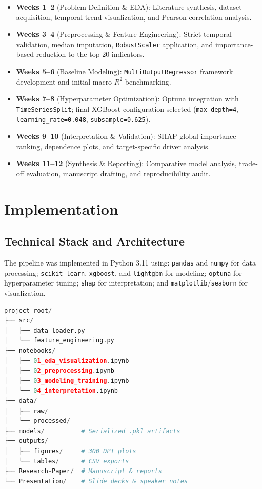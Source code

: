\documentclass[conference]{IEEEtran}
\begin{document}
\begin{itemize}
    \item \textbf{Weeks 1--2} (Problem Definition \& EDA): Literature
    synthesis, dataset acquisition, temporal trend visualization, and Pearson
    correlation analysis.
    \item \textbf{Weeks 3--4} (Preprocessing \& Feature Engineering): Strict
    temporal validation, median imputation, \texttt{RobustScaler} application,
    and importance-based reduction to the top 20 indicators.
    \item \textbf{Weeks 5--6} (Baseline Modeling): \texttt{MultiOutputRegressor}
    framework development and initial macro-$R^2$ benchmarking.
    \item \textbf{Weeks 7--8} (Hyperparameter Optimization): Optuna integration
    with \texttt{TimeSeriesSplit}; final XGBoost configuration selected
    (\texttt{max\_depth=4}, \texttt{learning\_rate=0.048},
    \texttt{subsample=0.625}).
    \item \textbf{Weeks 9--10} (Interpretation \& Validation): SHAP global
    importance ranking, dependence plots, and target-specific driver analysis.
    \item \textbf{Weeks 11--12} (Synthesis \& Reporting): Comparative model
    analysis, trade-off evaluation, manuscript drafting, and reproducibility
    audit.
\end{itemize}

\section{Implementation}

\subsection{Technical Stack and Architecture}

The pipeline was implemented in Python 3.11 using: \texttt{pandas} and
\texttt{numpy} for data processing; \texttt{scikit-learn}, \texttt{xgboost},
and \texttt{lightgbm} for modeling; \texttt{optuna} for hyperparameter tuning;
\texttt{shap} for interpretation; and \texttt{matplotlib}/\texttt{seaborn} for
visualization.

\begin{lstlisting}[language=Python, caption={Project structure overview.},
                   label=lst:structure]
project_root/
├── src/
│   ├── data_loader.py
│   └── feature_engineering.py
├── notebooks/
│   ├── 01_eda_visualization.ipynb
│   ├── 02_preprocessing.ipynb
│   ├── 03_modeling_training.ipynb
│   └── 04_interpretation.ipynb
├── data/
│   ├── raw/
│   └── processed/
├── models/          # Serialized .pkl artifacts
├── outputs/
│   ├── figures/     # 300 DPI plots
│   └── tables/      # CSV exports
├── Research-Paper/  # Manuscript & reports
└── Presentation/    # Slide decks & speaker notes
\end{lstlisting}
\end{document}
